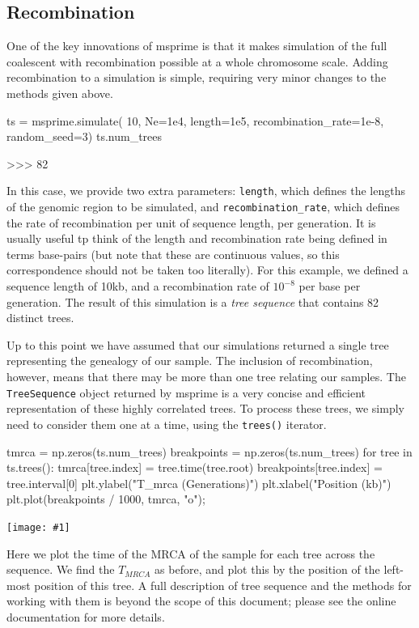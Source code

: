 \documentclass[graybox]{svmult}
\newcommand{\includenbimage}[1]{\begin{center}\texttt{[image: \#1]}\end{center}}
\begin{document}
\subsection{Recombination}\label{recombination}

One of the key innovations of msprime is that it makes simulation of the
full coalescent with recombination possible at a whole chromosome scale.
Adding recombination to a simulation is simple, requiring very minor
changes to the methods given above.

\begin{pythoncode}
ts = msprime.simulate(
    10, Ne=1e4, length=1e5, recombination_rate=1e-8, random_seed=3)
ts.num_trees

>>> 82
\end{pythoncode}

    In this case, we provide two extra parameters: \texttt{length}, which
defines the lengths of the genomic region to be simulated, and
\texttt{recombination\_rate}, which defines the rate of recombination
per unit of sequence length, per generation. It is usually useful tp
think of the length and recombination rate being defined in terms
base-pairs (but note that these are continuous values, so this
correspondence should not be taken too literally). For this example, we
defined a sequence length of 10kb, and a recombination rate of
\(10^{-8}\) per base per generation. The result of this simulation is a
\emph{tree sequence} that contains 82 distinct trees.

Up to this point we have assumed that our simulations returned a single
tree representing the genealogy of our sample. The inclusion of
recombination, however, means that there may be more than one tree
relating our samples. The \texttt{TreeSequence} object returned by
msprime is a very concise and efficient representation of these highly
correlated trees. To process these trees, we simply need to consider
them one at a time, using the \texttt{trees()} iterator.

\begin{pythoncode}
tmrca = np.zeros(ts.num_trees)
breakpoints = np.zeros(ts.num_trees)
for tree in ts.trees():
    tmrca[tree.index] = tree.time(tree.root)
    breakpoints[tree.index] = tree.interval[0]
plt.ylabel("T_mrca (Generations)")
plt.xlabel("Position (kb)")
plt.plot(breakpoints / 1000, tmrca, "o");
\end{pythoncode}

\includenbimage{images/simulations_50_0.pdf}

    Here we plot the time of the MRCA of the sample for each tree across the
sequence. We find the \(T_{MRCA}\) as before, and plot this by the
position of the left-most position of this tree. A full description of
tree sequence and the methods for working with them is beyond the scope
of this document; please see the online documentation for more details.
\end{document}
